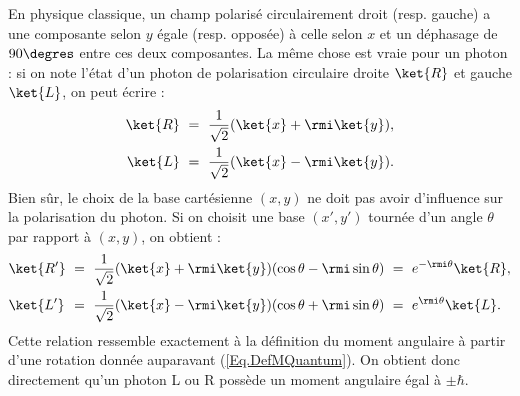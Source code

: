 En physique classique, un champ polarisé circulairement droit (resp. gauche) a une composante selon $y$ égale (resp. opposée) à celle selon $x$ et un déphasage de $90\degres$ entre ces deux composantes. La même chose est vraie pour un photon : si on note l'état d'un photon de polarisation circulaire droite $\ket{R}$ et gauche $\ket{L}$, on peut écrire :
\begin{align*}
\ket{R}~&=~\frac{1}{\sqrt{2}}(\ket{x}+\rmi\ket{y}),\\
\ket{L}~&=~\frac{1}{\sqrt{2}}(\ket{x}-\rmi\ket{y}).
\end{align*}
Bien sûr, le choix de la base cartésienne $(x,y)$ ne doit pas avoir d'influence sur la polarisation du photon. Si on choisit une base $(x',y')$ tournée d'un angle $\theta$ par rapport à $(x,y)$, on obtient :
\begin{equation*}
\begin{alignedat}{3}
&\ket{R'}~&&=~\frac{1}{\sqrt{2}}(\ket{x}+\rmi\ket{y})(\cos{\theta}-\rmi\sin{\theta}) ~&&=~ e^{-\rmi\theta}\ket{R},\\
&\ket{L'}~&&=~\frac{1}{\sqrt{2}}(\ket{x}-\rmi\ket{y})(\cos{\theta}+\rmi\sin{\theta}) ~&&=~ e^{\rmi\theta}\ket{L}.
\end{alignedat}
\end{equation*}
Cette relation ressemble exactement à la définition du moment angulaire à partir d'une rotation donnée auparavant (\ref{Eq.DefMQuantum}). On obtient donc directement qu'un photon L ou R possède un moment angulaire égal à $\pm\hbar$. 

